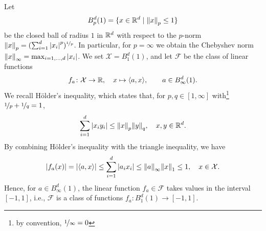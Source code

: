 \begin{example}
Let
\[
    B_p^d(1) = \{x \in \mathbb{R}^d \mathrel{|} \norm{x}_p \leq 1\}
\]
be the closed ball of radius $1$ in $\mathbb{R}^d$ with respect to the $p$-norm $\norm{x}_p = (\sum_{i=1}^d \abs{x_i}^p)^{\nicefrac{1}{p}}$. In particular, for $p = \infty$ we obtain the Chebyshev norm $\norm{x}_{\infty} = \max_{i=1, \dots, d} \abs{x_i}$. We set $\mathcal{X} = B_1^d(1)$, and let $\mathcal{F}$ be the class of linear functions
\[
    f_a \colon \mathcal{X} \to \mathbb{R}, \quad x \mapsto \langle a, x \rangle, \qquad a \in B_{\infty}^d(1).
\]
We recall H{\"o}lder's inequality, which states that, for $p, q \in [1, \infty]$ with\footnote{by convention, $\nicefrac{1}{\infty} = 0$} $\nicefrac{1}{p} + \nicefrac{1}{q} = 1$,
\[
    \sum_{i=1}^d \abs{x_i y_i} \leq \norm{x}_p \norm{y}_q, \quad x, y \in \mathbb{R}^d.
\]
By combining H{\"o}lder's inequality with the triangle inequality, we have
\[
    \abs{f_a(x)} = \abs{\langle a, x \rangle} \leq \sum_{i=1}^d \abs{a_i x_i} \leq \norm{a}_{\infty} \norm{x}_1 \leq 1, \quad x \in \mathcal{X}.
\]
Hence, for $a \in B_{\infty}^d(1)$, the linear function $f_a \in \mathcal{F}$ takes values in the interval $[-1, 1]$, i.e., $\mathcal{F}$ is a class of functions $f_a \colon B_1^d(1) \to [-1, 1]$.
\end{example}
